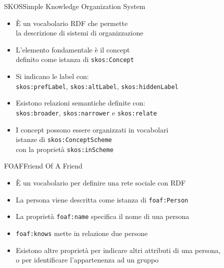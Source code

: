 \documentclass[dvips, 11pt]{beamer}
\begin{document}
\begin{frame}{SKOS}{Simple Knowledge Organization System}
  \begin{itemize}
  \item \`E un vocabolario RDF che permette\\
    la descrizione di sistemi di organizzazione
    \pause
  \item L'elemento fondamentale \`e il \alert{concept}\\
    definito come istanza di \texttt{skos:Concept}
    \pause
  \item Si indicano le label con:\\
    \texttt{skos:prefLabel}, \texttt{skos:altLabel}, \texttt{skos:hiddenLabel}
    \pause
  \item Esistono \alert{relazioni semantiche} definite con:\\
    \texttt{skos:broader}, \texttt{skos:narrower} e \texttt{skos:relate}
    \pause
  \item I concept possono essere organizzati in \alert{vocabolari}\\
    istanze di \texttt{skos:ConceptScheme}\\
    con la propriet\`a \texttt{skos:inScheme}
  \end{itemize}
\end{frame}

\begin{frame}{FOAF}{Friend Of A Friend}
  \begin{itemize}
  \item \`E un vocabolario per definire una \alert{rete sociale} con RDF
    \pause
  \item La persona viene descritta come istanza di \texttt{foaf:Person}
    \pause
  \item La propriet\`a \texttt{foaf:name} specifica il nome di una persona
    \pause
  \item \texttt{foaf:knows} mette in relazione due persone
    \pause
  \item Esistono altre propriet\`a per indicare altri attributi di una persona,\\
    o per identificare l'appartenenza ad un gruppo
  \end{itemize}
\end{frame}
\end{document}
